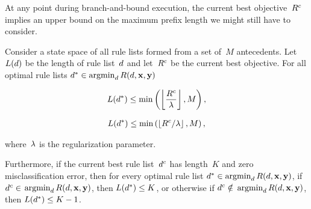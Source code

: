 At any point during branch-and-bound execution, the current best objective~${R^c}$
implies an upper bound on the maximum prefix length we might still have to consider.
%
\begin{theorem}
\label{thm:ub-prefix-length}
Consider a state space of all rule lists formed from a set of~$M$ antecedents.
%
Let~$L({d})$ be the length of rule list~${d}$
and let~${R^c}$ be the current best objective.
%
For all optimal rule lists ${d^* \in \operatorname*{argmin}_{d} R({d}, \mathbf{x}, \mathbf{y})}$
\begin{arxiv}
\begin{align}
L(d^*) \le \min \left(\left\lfloor \frac{{R^c}}{{\lambda}} \right\rfloor, M \right),
\label{eq:max-length}
\end{align}
\end{arxiv}
\begin{kdd}
\begin{align}
L(d^*) \le \min \left(\left\lfloor {R^c} / {\lambda} \right\rfloor, M \right),
\label{eq:max-length}
\end{align}
\end{kdd}
where~${\lambda}$ is the regularization parameter.
%
\begin{arxiv}
Furthermore, if the current best rule list~$d^c$
has length~$K$ and zero misclassification error,
then for every optimal rule list
${d^* \in \operatorname*{argmin}_{d} R({d}, \mathbf{x}, \mathbf{y})}$,
if ${d^c \in}$ ${\operatorname*{argmin}_d R({d}, \mathbf{x}, \mathbf{y})}$,
then ${L(d^*) \le K}$,
or otherwise if ${d^c \notin}$ ${\operatorname*{argmin}_d R({d}, \mathbf{x}, \mathbf{y})}$,
then ${L(d^*) \le K - 1}$.
\end{arxiv}
\end{theorem}

